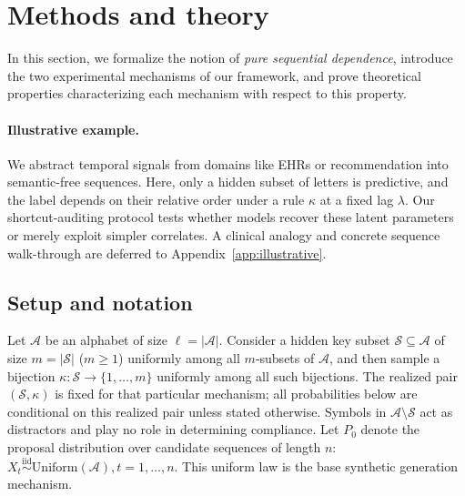 \documentclass[fullpaper]{nldl}
\theoremstyle{plain}
\theoremstyle{definition}
\theoremstyle{remark}
\begin{document}
\section{Methods and theory}
\label{sec:formulation}
In this section, we formalize the notion of \textit{pure sequential dependence}, introduce the two experimental mechanisms of our framework, and prove theoretical properties characterizing each mechanism with respect to this property.

\paragraph{Illustrative example.}
We abstract temporal signals from domains like EHRs or recommendation into semantic-free sequences. Here, only a hidden subset of letters is predictive, and the label depends on their relative order under a rule $\kappa$ at a fixed lag $\lambda$. Our shortcut-auditing protocol tests whether models recover these latent parameters or merely exploit simpler correlates. A clinical analogy and concrete sequence walk-through are deferred to Appendix~\ref{app:illustrative}.

\subsection{Setup and notation}
\label{sec:setup}

Let $\mathcal{A}$ be an alphabet of size $\ell = |\mathcal{A}|$. Consider a hidden key subset $\mathcal{S} \subseteq \mathcal{A}$ of size $m = |\mathcal{S}|$ ($m \geq 1$) uniformly among all $m$-subsets of $\mathcal{A}$, and then sample a bijection $\kappa : \mathcal{S} \to \{1,\ldots,m\}$ uniformly among all such bijections. The realized pair $(\mathcal{S},\kappa)$ is fixed for that particular mechanism; all probabilities below are conditional on this realized pair unless stated otherwise. Symbols in $\mathcal{A}\setminus\mathcal{S}$ act as distractors and play no role in determining compliance. Let $P_0$ denote the proposal distribution over candidate sequences of length $n$: $X_t \stackrel{\mathrm{iid}}{\sim} \mathrm{Uniform}(\mathcal{A}), t=1,\ldots,n.$ This \iid uniform law is the base synthetic generation mechanism.
\end{document}
